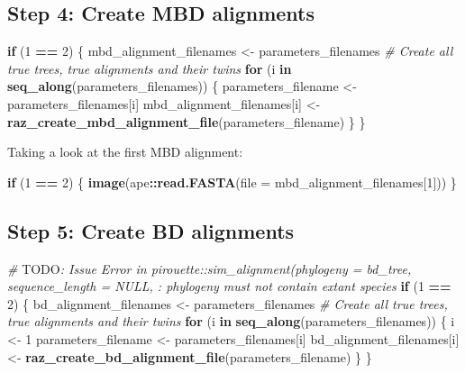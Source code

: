 \documentclass[]{article}
\newenvironment{Shaded}{\begin{snugshade}}{\end{snugshade}}
\newcommand{\KeywordTok}[1]{\textcolor[rgb]{0.13,0.29,0.53}{\textbf{#1}}}
\newcommand{\DataTypeTok}[1]{\textcolor[rgb]{0.13,0.29,0.53}{#1}}
\newcommand{\DecValTok}[1]{\textcolor[rgb]{0.00,0.00,0.81}{#1}}
\newcommand{\StringTok}[1]{\textcolor[rgb]{0.31,0.60,0.02}{#1}}
\newcommand{\CommentTok}[1]{\textcolor[rgb]{0.56,0.35,0.01}{\textit{#1}}}
\newcommand{\ControlFlowTok}[1]{\textcolor[rgb]{0.13,0.29,0.53}{\textbf{#1}}}
\newcommand{\OperatorTok}[1]{\textcolor[rgb]{0.81,0.36,0.00}{\textbf{#1}}}
\newcommand{\AlertTok}[1]{\textcolor[rgb]{0.94,0.16,0.16}{#1}}
\newcommand{\NormalTok}[1]{#1}
\begin{document}
\subsection{Step 4: Create MBD
alignments}\label{step-4-create-mbd-alignments}

\begin{Shaded}
\begin{Highlighting}[]
\ControlFlowTok{if}\NormalTok{ (}\DecValTok{1} \OperatorTok{==}\StringTok{ }\DecValTok{2}\NormalTok{) \{}
\NormalTok{  mbd_alignment_filenames <-}\StringTok{ }\NormalTok{parameters_filenames}
  \CommentTok{# Create all true trees, true alignments and their twins}
  \ControlFlowTok{for}\NormalTok{ (i }\ControlFlowTok{in} \KeywordTok{seq_along}\NormalTok{(parameters_filenames)) \{}
\NormalTok{    parameters_filename <-}\StringTok{ }\NormalTok{parameters_filenames[i]}
\NormalTok{    mbd_alignment_filenames[i] <-}\StringTok{ }\KeywordTok{raz_create_mbd_alignment_file}\NormalTok{(parameters_filename)}
\NormalTok{  \}}
\NormalTok{\}}
\end{Highlighting}
\end{Shaded}

Taking a look at the first MBD alignment:

\begin{Shaded}
\begin{Highlighting}[]
\ControlFlowTok{if}\NormalTok{ (}\DecValTok{1} \OperatorTok{==}\StringTok{ }\DecValTok{2}\NormalTok{) \{}
  \KeywordTok{image}\NormalTok{(ape}\OperatorTok{::}\KeywordTok{read.FASTA}\NormalTok{(}\DataTypeTok{file =}\NormalTok{ mbd_alignment_filenames[}\DecValTok{1}\NormalTok{]))}
\NormalTok{\}}
\end{Highlighting}
\end{Shaded}

\subsection{Step 5: Create BD
alignments}\label{step-5-create-bd-alignments}

\begin{Shaded}
\begin{Highlighting}[]
\CommentTok{# }\AlertTok{TODO}\CommentTok{: Issue Error in pirouette::sim_alignment(phylogeny = bd_tree, sequence_length = NULL, : phylogeny must not contain extant species}
\ControlFlowTok{if}\NormalTok{ (}\DecValTok{1} \OperatorTok{==}\StringTok{ }\DecValTok{2}\NormalTok{) \{}
\NormalTok{  bd_alignment_filenames <-}\StringTok{ }\NormalTok{parameters_filenames}
  \CommentTok{# Create all true trees, true alignments and their twins}
  \ControlFlowTok{for}\NormalTok{ (i }\ControlFlowTok{in} \KeywordTok{seq_along}\NormalTok{(parameters_filenames)) \{}
\NormalTok{    i <-}\StringTok{ }\DecValTok{1}
\NormalTok{    parameters_filename <-}\StringTok{ }\NormalTok{parameters_filenames[i]}
\NormalTok{    bd_alignment_filenames[i] <-}\StringTok{ }\KeywordTok{raz_create_bd_alignment_file}\NormalTok{(parameters_filename)}
\NormalTok{  \}}
\NormalTok{\}}
\end{Highlighting}
\end{Shaded}
\end{document}

